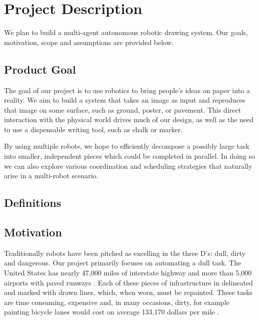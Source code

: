 
\section{Project Description}
\label{sec:project_description}
We plan to build a multi-agent autonomous robotic drawing system. Our goals, motivation,  scope and assumptions are provided below.

\subsection{Product Goal}
\label{sec:project_goal}
The goal of our project is to use robotics to bring people's ideas on paper into a reality. 
We aim to build a system that takes an image as input and reproduces that image on some surface, such as ground, poster, or pavement.
This direct interaction with the physical world drives much of our design, as well as the need to use a dispensable writing tool, such as chalk or marker. 

By using multiple robots, we hope to efficiently decompose a possibly large task into smaller, independent pieces which could be completed in parallel.
In doing so we can also explore various coordination and scheduling strategies that naturally arise in a multi-robot scenario. 

\subsection{Definitions}
\label{sec:definitions}


\subsection{Motivation}
\label{sec:motivation}

Traditionally robots have been pitched as excelling in the three D's: dull, dirty and dangerous. Our project primarily focuses on automating a dull task. The United States has nearly 47,000 miles of interstate highway and more than 5,000 airports with paved runways \cite{buildfuture}. Each of these pieces of infrastructure in delineated and marked with drawn lines, which, when worn, must be repainted. These tasks are time consuming, expensive and, in many occasions, dirty, for example painting bicycle lanes would cost on average 133,170 dollars per mile \cite{bicyclist}.

